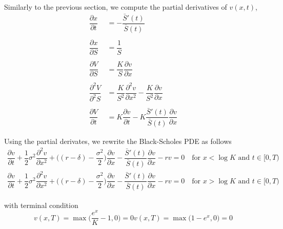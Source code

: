 \newpage

Similarly to the previous section, we compute the partial derivatives of $v(x,t)$,
\begin{align*}
  \dfrac{\partial x}{\partial t} &= -\dfrac{\bar{S}'(t) }{\bar{S}(t)} \\\\
  \dfrac{\partial x}{\partial S} &= \dfrac{1}{S} \\\\ 
  \dfrac{\partial V}{\partial S} &= \dfrac{K}{S} \dfrac{\partial v}{\partial x} \\\\
  \dfrac{\partial^2 V}{\partial^2 S} &= \dfrac{K}{S^2}\dfrac{\partial^2 v}{\partial x^2} - \dfrac{K}{S^2} \dfrac{\partial v}{\partial x} \\\\
  \dfrac{\partial V}{\partial t} &= K \dfrac{\partial v}{\partial t} - K\dfrac{\bar{S}'(t)}{\bar{S}(t)}\dfrac{\partial v}{\partial x}
\end{align*}

Using the partial derivates, we rewrite the Black-Scholes PDE as follows
\begin{subequations}
  \begin{align}
      \dfrac{\partial v}{\partial t} + \dfrac{1}{2}\sigma^2\dfrac{\partial^2 v}{\partial x^2} + \bigg((r-\delta) - \dfrac{\sigma^2}{2} \bigg)\dfrac{\partial v}{\partial x} -\dfrac{\bar{S}'(t)}{\bar{S}(t)}\dfrac{\partial v}{\partial x} - rv = 0 \quad \text{for $x < \log{K}$ and $t \in [0, T)$} \\
      \dfrac{\partial v}{\partial t} + \dfrac{1}{2}\sigma^2\dfrac{\partial^2 v}{\partial x^2} + \bigg((r-\delta) - \dfrac{\sigma^2}{2} \bigg)\dfrac{\partial v}{\partial x} -\dfrac{\bar{S}'(t)}{\bar{S}(t)}\dfrac{\partial v}{\partial x} - rv = 0 \quad \text{for $x > \log{K}$ and $t \in [0, T)$}
  \end{align}
\end{subequations}

with terminal condition
\begin{subequations} \label{eq:blackscholes:frontfixingmethod:logtransform:american_options_terminal_condition}
  \begin{equation}
    v(x, T) = \max\bigg(\dfrac{e^x}{K} - 1, 0\bigg) = 0
  \end{equation}
  \begin{equation}
    v(x, T) = \max\bigg(1 - e^x, 0\bigg) = 0
  \end{equation}
\end{subequations}

